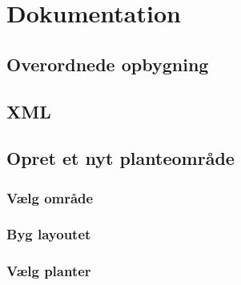 \newpage
\section{Dokumentation}

\subsection{Overordnede opbygning}

\subsection{XML}

\subsection{Opret et nyt planteområde}
\subsubsection{Vælg område}

\subsubsection{Byg layoutet}

\subsubsection{Vælg planter}
